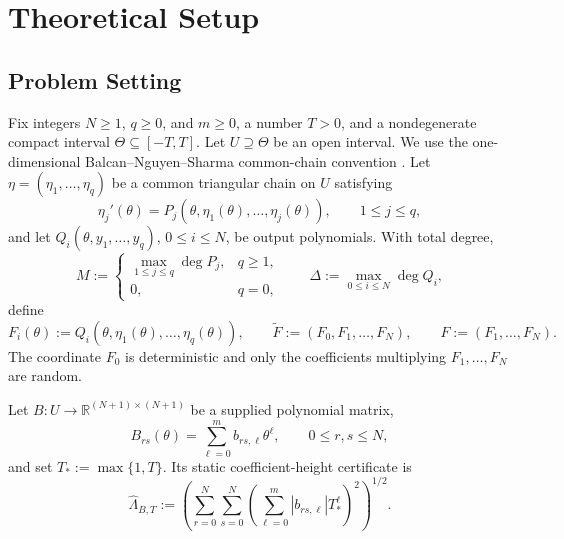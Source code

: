 \section{Theoretical Setup}\label{sec:theoretical-setup}

\subsection{Problem Setting}\label{sec:problem-setting}
Fix integers $N\geq1$, $q\geq0$, and $m\geq0$, a number $T>0$, and a nondegenerate compact interval
$\Theta\subseteq[-T,T]$. Let $U\supseteq\Theta$ be an open interval. We use the one-dimensional
Balcan--Nguyen--Sharma common-chain convention \citep{balcan2024structured}. Let
$\eta=(\eta_1,\ldots,\eta_q)$ be a common triangular chain on $U$ satisfying
\begin{equation}
\label{eq:setup-display-001}
\eta_j'(\theta)=P_j(\theta,\eta_1(\theta),\ldots,\eta_j(\theta)),\qquad 1\leq j\leq q,
\end{equation}
and let $Q_i(\theta,y_1,\ldots,y_q)$, $0\leq i\leq N$, be output polynomials. With total degree,
\begin{equation}
\label{eq:setup-display-002}
M:=\begin{cases}\max_{1\leq j\leq q}\deg P_j,&q\geq1,\\0,&q=0,\end{cases}
\qquad
\Delta:=\max_{0\leq i\leq N}\deg Q_i,
\end{equation}
define
\begin{equation}
\label{eq:setup-display-003}
F_i(\theta):=Q_i(\theta,\eta_1(\theta),\ldots,\eta_q(\theta)),
\qquad
\widetilde F:=(F_0,F_1,\ldots,F_N),
\qquad F:=(F_1,\ldots,F_N).
\end{equation}
The coordinate $F_0$ is deterministic and only the coefficients multiplying $F_1,\ldots,F_N$ are random.

Let $B:U\to\mathbb R^{(N+1)\times(N+1)}$ be a supplied polynomial matrix,
\begin{equation}
\label{eq:setup-display-004}
B_{rs}(\theta)=\sum_{\ell=0}^{m}b_{rs,\ell}\theta^\ell,
\qquad 0\leq r,s\leq N,
\end{equation}
and set $T_*:=\max\{1,T\}$. Its static coefficient-height certificate is
\begin{equation}
\label{eq:setup-display-005}
\widehat\Lambda_{B,T}:=\left(\sum_{r=0}^{N}\sum_{s=0}^{N}
\left(\sum_{\ell=0}^{m}|b_{rs,\ell}|T_*^\ell\right)^2\right)^{1/2}.
\end{equation}

